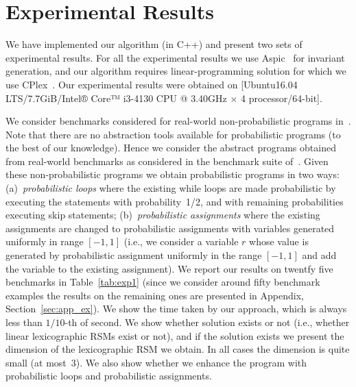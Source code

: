 
\section{Experimental Results}\label{sec:experiments}
We have implemented our algorithm (in C++) and present two sets of experimental results.
For all the experimental results we use Aspic~\cite{} for invariant generation, 
and our algorithm requires linear-programming solution for which we use CPlex~\cite{}.
Our experimental results were obtained on [Ubuntu16.04 LTS/7.7GiB/Intel® Core™ i3-4130 CPU @ 3.40GHz × 4 processor/64-bit].


\smallskip{}
We consider benchmarks considered for real-world non-probabilistic programs 
in~\cite{ADFG10:lexicographic}.
Note that there are no abstraction tools available for probabilistic programs (to the
best of our knowledge). 
Hence we consider the abstract programs obtained from real-world benchmarks as 
considered in the benchmark suite of~\cite{ADFG10:lexicographic}.
Given these non-probabilistic programs we obtain probabilistic programs in two ways:
(a)~{\em probabilistic loops} where the existing while loops are made probabilistic 
by executing the statements with probability~1/2, and with remaining probabilities 
executing skip statements;
(b)~{\em probabilistic assignments} where the existing assignments are changed to 
probabilistic assignments with variables generated uniformly in range $[-1,1]$ 
(i.e., we consider a variable $r$ whose value is generated by probabilistic 
assignment uniformly in the range $[-1,1]$ and add the variable to the existing 
assignment).
We report our results on twentfy five benchmarks in Table~\ref{tab:exp1} (since we consider around 
fifty benchmark examples the results on the remaining ones are presented in Appendix, Section~\ref{sec:app_ex}).
We show the time taken by our approach, which is always less than $1/10$-th of second.
We show whether solution exists or not (i.e., whether linear lexicographic RSMs exist
or not), and if the solution exists we present the dimension of the lexicographic RSM
we obtain. In all cases the dimension is quite small (at most~3). 
We also show whether we enhance the program with probabilistic loops and probabilistic assignments.


